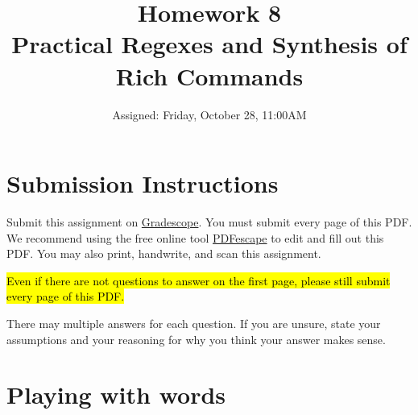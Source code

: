 \documentclass{article}
\begin{document}
\fancyfoot[C]{\color{gray} \thepage~/~\pageref*{LastPage}}
\pagestyle{fancyplain}



\title{\textbf{Homework 8\\Practical Regexes and Synthesis of Rich
Commands}}
\author{Assigned: Friday, October 28, 11:00AM}
\date{\textbf{\color{red}{Due: Friday, November 5, 10:00PM (Hard Deadline)}}}
\maketitle


\section*{Submission Instructions}
Submit this assignment on \href{https://gradescope.com/courses/2248}{Gradescope}.
You must submit every page of this PDF.
We recommend using the free online tool \href{https://www.pdfescape.com}{PDFescape}
to edit and fill out this PDF.
You may also print, handwrite, and scan this assignment.

\medskip
\noindent
\hl{Even if there are not questions to answer on the first page, please still
submit every page of this PDF.}

\medskip
\noindent
There may multiple answers for each question. If you are unsure,
state your assumptions and your reasoning for why you think your answer
makes sense.


\section{Playing with words}
\end{document}
